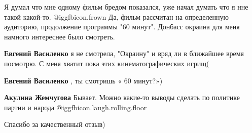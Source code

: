 \begin{itemize}
Я думал что мне одному фильм бредом показался, уже начал думать что я нне такой
какой-то. @igg{fbicon.frown}  Да, фильм рассчитан на определенную аудиторию, продолжение
программы "60 минут". Донбасс окраина для меня намного интереснее было
смотреть.

\begin{itemize} %
\textbf{Евгений Василенко} я не смотрела, "Окраину" и вряд ли в ближайшее время посмотрю. С меня хватит пока этих кинематографических игрищ(

\textbf{Евгений Василенко} , ты смотришь « 60 минут?»)

\textbf{Акулина Жемчугова} Бывает. Можно какие-то выводы сделать по политике партии и народа @igg{fbicon.laugh.rolling.floor} 
\end{itemize} %

Спасибо за качественный отзыв)

\end{itemize} %
